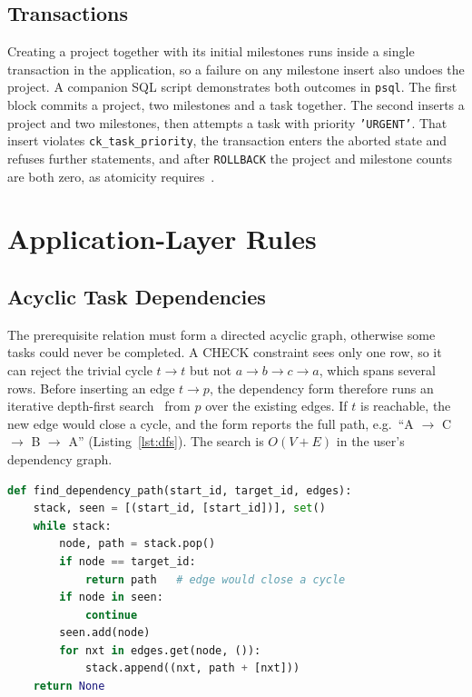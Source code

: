 \documentclass[conference]{IEEEtran}
\begin{document}
\subsection{Transactions}

Creating a project together with its initial milestones runs inside a single
transaction in the application, so a failure on any milestone insert also undoes
the project. A companion SQL script demonstrates both outcomes in
\texttt{psql}. The first block commits a project, two milestones and a task
together. The second inserts a project and two milestones, then attempts a task
with priority \texttt{'URGENT'}. That insert violates \texttt{ck\_task\_priority},
the transaction enters the aborted state and refuses further statements, and
after \texttt{ROLLBACK} the project and milestone counts are both zero, as
atomicity requires~\cite{haerder1983}.

\section{Application-Layer Rules}
\label{sec:app}

\subsection{Acyclic Task Dependencies}

The prerequisite relation must form a directed acyclic graph, otherwise some
tasks could never be completed. A CHECK constraint sees only one row, so it can
reject the trivial cycle $t \rightarrow t$ but not
$a \rightarrow b \rightarrow c \rightarrow a$, which spans several rows.
Before inserting an edge $t \rightarrow p$, the dependency form therefore runs an
iterative depth-first search~\cite{tarjan1972} from $p$ over the existing
edges. If $t$ is reachable, the new edge would close a cycle, and the form
reports the full path, e.g.\ ``A $\rightarrow$ C $\rightarrow$ B $\rightarrow$
A'' (Listing~\ref{lst:dfs}). The search is $O(V+E)$ in the user's dependency
graph.

\begin{lstlisting}[style=code,float=tb,language=Python,caption={Reachability check used before inserting a dependency edge},label={lst:dfs}]
def find_dependency_path(start_id, target_id, edges):
    stack, seen = [(start_id, [start_id])], set()
    while stack:
        node, path = stack.pop()
        if node == target_id:
            return path   # edge would close a cycle
        if node in seen:
            continue
        seen.add(node)
        for nxt in edges.get(node, ()):
            stack.append((nxt, path + [nxt]))
    return None
\end{lstlisting}
\end{document}
